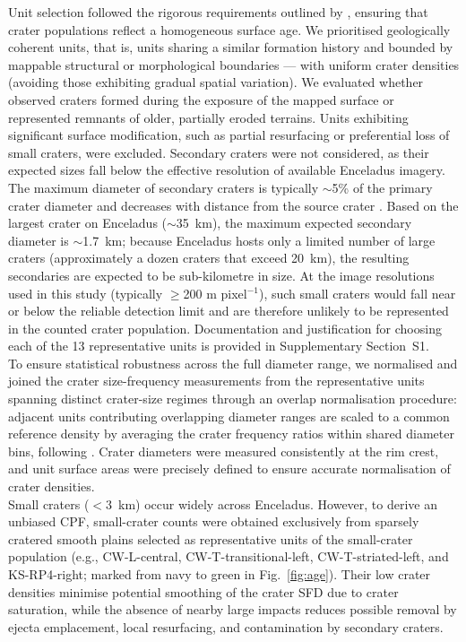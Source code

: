 \documentclass[preprint,11pt,3p,times,authoryear]{elsarticle}
\begin{document}
Unit selection followed the rigorous requirements outlined by \citet{Neukum1983}, ensuring that crater populations reflect a homogeneous surface age. We prioritised geologically coherent units, that is, units sharing a similar formation history and bounded by mappable structural or morphological boundaries --- with uniform crater densities (avoiding those exhibiting gradual spatial variation). We evaluated whether observed craters formed during the exposure of the mapped surface or represented remnants of older, partially eroded terrains. Units exhibiting significant surface modification, such as partial resurfacing or preferential loss of small craters, were excluded. 
Secondary craters were not considered, as their expected sizes fall below the effective resolution of available Enceladus imagery. The maximum diameter of secondary craters is typically $\sim$5\% of the primary crater diameter \citep{Schultz1980, Bierhaus2018} and decreases with distance from the source crater \citep{McEwen2006}. 
Based on the largest crater on Enceladus ($\sim$35~km), the maximum expected secondary diameter is $\sim$1.7~km; because Enceladus hosts only a limited number of large craters (approximately a dozen craters that exceed 20~km), the resulting secondaries are expected to be sub-kilometre in size.
At the image resolutions used in this study (typically $\ge$200 m pixel$^{-1}$), such small craters would fall near or below the reliable detection limit and are therefore unlikely to be represented in the counted crater population. Documentation and justification for choosing each of the 13 representative units is provided in Supplementary Section~S1.\\

To ensure statistical robustness across the full diameter range, we normalised and 
joined the crater size-frequency measurements from the representative units spanning distinct crater-size regimes through an overlap normalisation procedure: adjacent units contributing overlapping diameter ranges 
are scaled to a common reference density by averaging the crater frequency ratios within shared diameter bins, following \citet{Neukum1983}.
Crater diameters were measured consistently at the rim crest, and unit surface areas were precisely defined to ensure accurate normalisation of crater densities.\\

Small craters ($<3$~km) occur widely across Enceladus. However, to derive an unbiased CPF, small-crater counts were obtained exclusively from sparsely cratered smooth plains selected as representative units of the small-crater population (e.g., CW-L-central, CW-T-transitional-left, CW-T-striated-left, and KS-RP4-right; marked from navy to green in Fig.~\ref{fig:age}). Their low crater densities minimise potential smoothing of the crater SFD due to crater saturation, while the absence of nearby large impacts reduces possible removal by ejecta emplacement, local resurfacing, and contamination by secondary craters.\\
\end{document}
